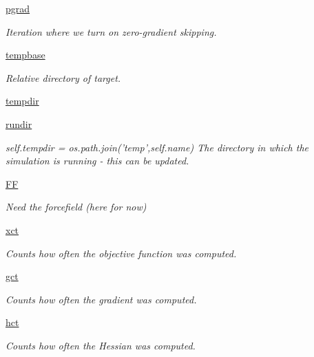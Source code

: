 \begin{DoxyCompactItemize}
\hyperlink{classforcebalance_1_1target_1_1Target_a684235b4332b608c4e2da22982c2fdfa}{pgrad}
\begin{DoxyCompactList}\small\item\em Iteration where we turn on zero-\/gradient skipping. \end{DoxyCompactList}\item 
\hyperlink{classforcebalance_1_1target_1_1Target_ae5b544d3e11365865813ef3d626ef81d}{tempbase}
\begin{DoxyCompactList}\small\item\em Relative directory of target. \end{DoxyCompactList}\item 
\hyperlink{classforcebalance_1_1target_1_1Target_aa1f01b5b78db253b5b66384ed11ed193}{tempdir}
\item 
\hyperlink{classforcebalance_1_1target_1_1Target_a6872de5b2d4273b82336ea5b0da29c9e}{rundir}
\begin{DoxyCompactList}\small\item\em self.\-tempdir = os.\-path.\-join('temp',self.\-name) The directory in which the simulation is running -\/ this can be updated. \end{DoxyCompactList}\item 
\hyperlink{classforcebalance_1_1target_1_1Target_a38a37919783141ea37fdcf8b00ce0aaf}{F\-F}
\begin{DoxyCompactList}\small\item\em Need the forcefield (here for now) \end{DoxyCompactList}\item 
\hyperlink{classforcebalance_1_1target_1_1Target_aad2e385cfbf7b4a68f1c2cb41133fe82}{xct}
\begin{DoxyCompactList}\small\item\em Counts how often the objective function was computed. \end{DoxyCompactList}\item 
\hyperlink{classforcebalance_1_1target_1_1Target_aa625ac88c6744eb14ef281d9496d0dbb}{gct}
\begin{DoxyCompactList}\small\item\em Counts how often the gradient was computed. \end{DoxyCompactList}\item 
\hyperlink{classforcebalance_1_1target_1_1Target_a5b5a42f78052b47f29ed4b940c6111a1}{hct}
\begin{DoxyCompactList}\small\item\em Counts how often the Hessian was computed. \end{DoxyCompactList}\item 

\end{DoxyCompactItemize}
